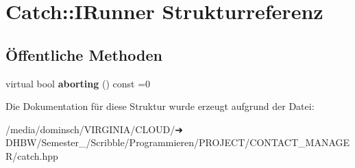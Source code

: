 \hypertarget{structCatch_1_1IRunner}{}\section{Catch\+:\+:I\+Runner Strukturreferenz}
\label{structCatch_1_1IRunner}
\subsection*{Öffentliche Methoden}
\begin{DoxyCompactItemize}
\item 
\mbox{\label{structCatch_1_1IRunner_a03713202dd2e041e30b8030088ab0116}} 
virtual bool {\bfseries aborting} () const =0
\end{DoxyCompactItemize}


Die Dokumentation für diese Struktur wurde erzeugt aufgrund der Datei\+:\begin{DoxyCompactItemize}
\item 
/media/dominsch/\+V\+I\+R\+G\+I\+N\+I\+A/\+C\+L\+O\+U\+D/➔ D\+H\+B\+W/\+Semester\+\_/\+Scribble/\+Programmieren/\+P\+R\+O\+J\+E\+C\+T/\+C\+O\+N\+T\+A\+C\+T\+\_\+\+M\+A\+N\+A\+G\+E\+R/catch.\+hpp\end{DoxyCompactItemize}
